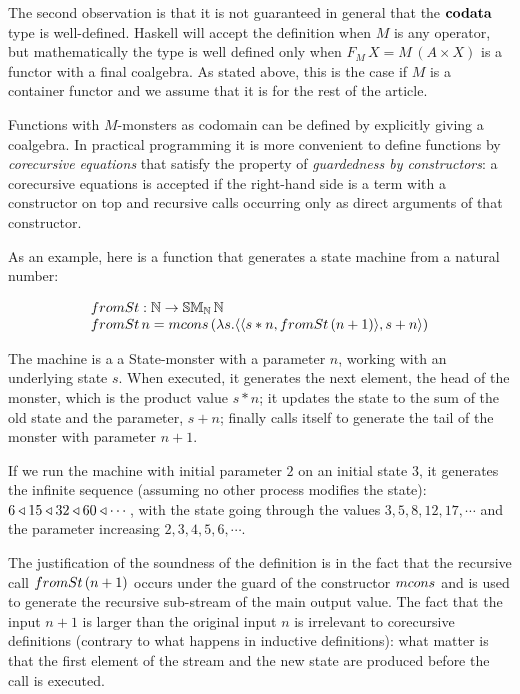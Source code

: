 The second observation is that it is not guaranteed in general that the $\mathbf{codata}$ type is well-defined.
Haskell will accept the definition when $M$ is any operator, but mathematically the type is well defined only when $F_M\,X = M\,(A\times X)$ is a functor with a final coalgebra.
As stated above, this is the case if $M$ is a container functor and we assume that it is for the rest of the article.

Functions with $M$-monsters as codomain can be defined by explicitly giving a coalgebra.
In practical programming it is more convenient to define functions by {\em corecursive equations} that satisfy the property of {\em guardedness by constructors}:
a corecursive equations is accepted if the right-hand side is a term with a constructor on top and recursive calls occurring only as direct arguments of that constructor.

As an example, here is a function that generates a state machine from a natural number:

$$
\begin{array}{l}
\frominc : \nat \rightarrow \stmon{\nat}\,\nat \\
\frominc\, n = \mcons\, (
   \lambda s. \pair{\pair{s*n}{\frominc\, (n + 1)}}{s+n}
                        )
\end{array}
$$

The machine is a  a State-monster with a parameter $n$,
working with an underlying state $s$.
When executed, it generates the next element, the head of the monster, which is the product value $s*n$; it updates the state to the sum of the old state and the parameter, $s+n$; finally calls itself to generate the tail of the monster with parameter $n+1$.

If we run the machine with initial parameter $2$ on an initial state $3$,
it generates the infinite sequence (assuming no other process modifies the state): $6 \triangleleft 15 \triangleleft 32 \triangleleft 60 \triangleleft \cdots$, with the state going through the values $3, 5, 8, 12, 17, \cdots$ and the parameter increasing $2, 3, 4, 5, 6, \cdots$.

The justification of the soundness of the definition is in the fact that the recursive call $\frominc\, (n + 1)$ occurs under the guard of the constructor $\mcons $ and is used to generate the recursive sub-stream of the main output value.
The fact that the input $n+1$ is larger than the original input $n$ is irrelevant to corecursive definitions (contrary to what happens in inductive definitions): what matter is that the first element of the stream and the new state are produced before the call is executed.

